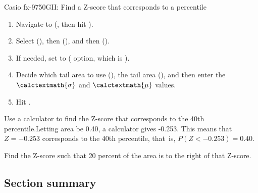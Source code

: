 \begin{onebox}{ Casio fx-9750GII: Find a Z-score that corresponds to a percentile}
\begin{enumerate}
\setlength{\itemsep}{0mm}
\setlength{\itemsep}{0mm}
\item Navigate to  (, then hit ).
\item Select  (), then  (), and then  ().
\item If needed, set  to  ( option, which is ).
\item Decide which tail area to use (), the tail area (), and then enter the $\calctextmath{\sigma}$ and $\calctextmath{\mu}$ values.
\item Hit .
\end{enumerate}
\end{onebox}


\begin{examplewrap}
\begin{nexample}{Use a calculator to find the Z-score that corresponds to the 40th percentile.}Letting area be 0.40, a calculator gives -0.253. This means that $Z = -0.253$ corresponds to the 40th percentile, that~is, $P(Z < -0.253) = 0.40$.
\end{nexample}
\end{examplewrap}

\begin{exercisewrap}
\begin{nexercise}Find the Z-score such that 20 percent of the area is to the right of that Z-score.\footnotemark\end{nexercise}
\end{exercisewrap}	


\B{\newpage}

\subsection*{Section summary}

